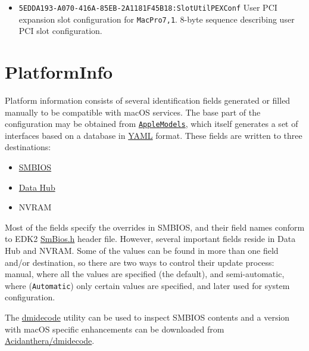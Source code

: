\documentclass[]{article}
\providecommand{\tightlist}{%
  \setlength{\itemsep}{0pt}\setlength{\parskip}{0pt}}
\begin{document}
\begin{itemize}
  Refer to the \href{https://support.apple.com/HT210104}{support page}
  for more details on how \texttt{MacPro7,1} slots are configured.

\item
  \texttt{5EDDA193-A070-416A-85EB-2A1181F45B18:SlotUtilPEXConf}
  \break
  User PCI expansion slot configuration for \texttt{MacPro7,1}.
  8-byte sequence describing user PCI slot configuration.

\end{itemize}

\section{PlatformInfo}\label{platforminfo}

Platform information consists of several identification fields
generated or filled manually to be compatible with macOS services. The
base part of the configuration may be obtained from
\href{https://github.com/acidanthera/MaxRegnerPkg/blob/master/AppleModels}{\texttt{AppleModels}},
which itself generates a set of interfaces based on a database
in \href{https://yaml.org/spec/1.2/spec.html}{YAML} format. These fields
are written to three destinations:

\begin{itemize}
\tightlist
\item
  \href{https://www.dmtf.org/standards/smbios}{SMBIOS}
\item
  \href{https://github.com/acidanthera/MaxRegnerPkg/blob/master/Include/Intel/Protocol/DataHub.h}{Data
  Hub}
\item
  NVRAM
\end{itemize}

Most of the fields specify the overrides in SMBIOS, and their field
names conform to EDK2
\href{https://github.com/acidanthera/audk/blob/master/MdePkg/Include/IndustryStandard/SmBios.h}{SmBios.h}
header file. However, several important fields reside in Data Hub and
NVRAM. Some of the values can be found in more than one field and/or
destination, so there are two ways to control their update process:
manual, where all the values are specified (the default), and semi-automatic,
where (\texttt{Automatic}) only certain values are specified, and later used
for system configuration.

The \href{http://www.nongnu.org/dmidecode}{dmidecode} utility can be used to inspect
SMBIOS contents and a version with macOS specific enhancements can be downloaded
from \href{https://github.com/acidanthera/dmidecode/releases}{Acidanthera/dmidecode}.
\end{document}
